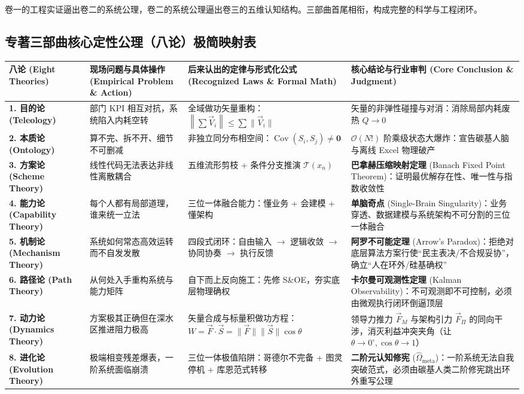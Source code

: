 \documentclass[11pt,a4paper,oneside]{ctexart}
\begin{document}
卷一的工程实证逼出卷二的系统公理，卷二的系统公理逼出卷三的五维认知结构。三部曲首尾相衔，构成完整的科学与工程闭环。


\subsection{专著三部曲核心定性公理（八论）极简映射表}

\begin{table}[htbp]
\centering
\small
\begin{tabular}{p{2.8cm}p{3.8cm}p{4.2cm}p{4.2cm}}
\toprule
八论 (Eight Theories) & 现场问题与具体操作 (Empirical Problem \& Action) & 后来认出的定律与形式化公式 (Recognized Laws \& Formal Math) & 核心结论与行业审判 (Core Conclusion \& Judgment) \\
\midrule
\textbf{1. 目的论 (Teleology)} & 部门 KPI 相互对抗，系统陷入内耗空转 & 全域做功矢量重构：$\left\|\sum \vec{V}_i\right\| \le \sum \|\vec{V}_i\|$ & 矢量的非弹性碰撞与对消：消除局部内耗废热 $Q \to 0$ \\
\textbf{2. 本质论 (Ontology)} & 算不完、拆不开、细节不可删减 & 非独立同分布相空间：$\operatorname{Cov}(S_i, S_j) \neq \mathbf{0}$ & $\mathcal{O}(N!)$ 阶乘级状态大爆炸：宣告碳基人脑与离线 Excel 物理破产 \\
\textbf{3. 方案论 (Scheme Theory)} & 线性代码无法表达非线性离散耦合 & 五维流形剪枝 + 条件分支推演 $\mathcal{T}(x_n)$ & \textbf{巴拿赫压缩映射定理} (Banach Fixed Point Theorem)：证明最优解存在性、唯一性与指数收敛性 \\
\textbf{4. 能力论 (Capability Theory)} & 每个人都有局部道理，谁来统一立法 & 三位一体融合能力：懂业务 + 会建模 + 懂架构 & \textbf{单脑奇点} (Single-Brain Singularity)：业务穿透、数据建模与系统架构不可分割的三位一体融合 \\
\textbf{5. 机制论 (Mechanism Theory)} & 系统如何常态高效运转而不自发发散 & 四段式闭环：自由输入 $\to$ 逻辑收敛 $\to$ 协同协奏 $\to$ 执行反馈 & \textbf{阿罗不可能定理} (Arrow's Paradox)：拒绝对底层算法方案行使“民主表决/不合规妥协”，确立“人在环外/硅基确权” \\
\textbf{6. 路径论 (Path Theory)} & 从何处入手重构系统与能力矩阵 & 自下而上反向施工：先修 S\&OE，夯实底层物理确权 & \textbf{卡尔曼可观测性定理} (Kalman Observability)：不可观测即不可控制，必须由微观执行闭环倒逼顶层 \\
\textbf{7. 动力论 (Dynamics Theory)} & 方案极其正确但在深水区推进阻力极高 & 矢量合成与标量积做功方程：$W = \vec{F} \cdot \vec{S} = \|\vec{F}\| \|\vec{S}\| \cos\theta$ & 领导力推力 $\vec{F}_M$ 与架构引力 $\vec{F}_\Pi$ 的同向干涉，消灭利益冲突夹角（让 $\theta \to 0^\circ, \cos\theta \to 1$） \\
\textbf{8. 进化论 (Evolution Theory)} & 极端相变残差爆表，一阶系统面临崩溃 & 三位一体极值陷阱：哥德尔不完备 + 图灵停机 + 库恩范式转移 & \textbf{二阶元认知修宪} ($\hat{\Omega}_{\text{meta}}$)：一阶系统无法自我突破范式，必须由碳基人类二阶修宪跳出环外重写公理 \\
\bottomrule
\end{tabular}
\end{table}
\end{document}
